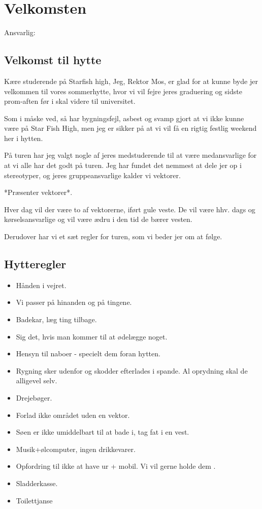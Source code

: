 \section{Velkomsten}
Ansvarlig: \KABS
\subsection{Velkomst til hytte}

Kære studerende på Starfish high, Jeg, Rektor Mos, er glad for at kunne byde jer velkommen til vores sommerhytte, hvor vi vil fejre jeres graduering og sidste prom-aften før i skal videre til universitet.

Som i måske ved, så har bygningsfejl, asbest og svamp gjort at vi ikke kunne være på Star Fish High, men jeg er sikker på at vi vil få en rigtig festlig weekend her i hytten.

På turen har jeg valgt nogle af jeres medstuderende til at være medansvarlige for at vi alle har det godt på turen. Jeg har fundet det nemmest at dele jer op i stereotyper, og jeres gruppeansvarlige kalder vi vektorer.

*Præsenter vektorer*.

Hver dag vil der være to af vektorerne, iført gule veste. De vil være hhv. dags og kørselsansvarlige og vil være ædru i den tid de bærer vesten. 

Derudover har vi et sæt regler for turen, som vi beder jer om at følge.  

\subsection{Hytteregler}
\begin{itemize}
  \item Hånden i vejret.
  \item Vi passer på hinanden og på tingene.
  \item Badekar, læg ting tilbage.
  \item Sig det, hvis man kommer til at ødelægge noget.
  \item Hensyn til naboer - specielt dem foran hytten.
  \item Rygning sker udenfor og skodder efterlades i spande. Al oprydning skal de alligevel selv.
  \item Drejebøger.
  \item Forlad ikke området uden en vektor.
  \item Søen er ikke umiddelbart til at bade i, tag fat i en vest.
  \item Musik+ølcomputer, ingen drikkevarer.
  \item Opfordring til ikke at have ur + mobil. Vi vil gerne holde dem .
  \item Sladderkasse.
  \item Toilettjanse
\end{itemize}

